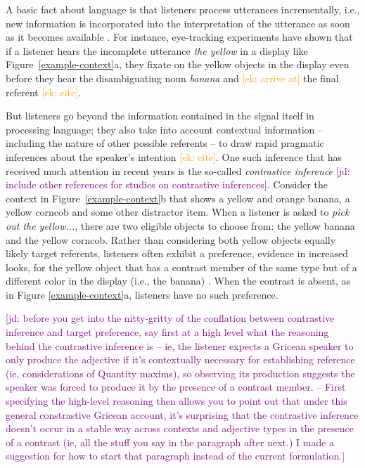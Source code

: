 \documentclass[10pt,letterpaper]{article}
\newcommand{\ek}[1]{\textcolor{Orange}{[ek: #1]}}
\newcommand{\jd}[1]{\textcolor{Purple}{[jd: #1]}}
\newcommand{\figref}[1]{Figure \ref{#1}}
\begin{document}
A basic fact about language is that listeners process utterances incrementally, i.e., new information is incorporated into the interpretation of the utterance as soon as it becomes available \cite{Eberhard:1995}. For instance, eye-tracking experiments have shown that if a listener hears the incomplete utterance \textit{the yellow} in a display like Figure~\ref{example-context}a, they fixate on the yellow objects in the display even before they hear the disambiguating noun \textit{banana} and \ek{arrive at} the final referent \ek{cite}.

But listeners go beyond the information contained in the signal itself in processing language; they also take into account contextual information -- including the nature of other possible referents  -- to draw rapid pragmatic inferences about the speaker's intention \ek{cite}. One such inference that has received much attention in recent years is the so-called \emph{contrastive inference} \cite{Sedivy:1999}\jd{include other references for studies on contrastive inferences}. Consider the context in Figure~\ref{example-context}b that shows a yellow and orange banana, a yellow corncob and some other distractor item. When a listener is asked to \textit{pick out the yellow...}, there are two eligible objects to choose from: the yellow banana and the yellow corncob. Rather than considering both yellow objects equally likely target referents, listeners often exhibit a preference, evidence in increased looks, for the yellow object that has a contrast member of the same type but of a different color in the display (i.e., the banana) \cite{Sedivy:1999, Sedivy:2003}. When the contrast is absent, as in \figref{example-context}a, listeners have no such preference. %

\jd{before you get into the nitty-gritty of the conflation between contrastive inference and target preference, say first at a high level what the reasoning behind the contrastive inference is -- ie, the listener expects a Gricean speaker to only produce the adjective if it's contextually necessary for establishing reference (ie, considerations of Quantity maxims), so observing its production suggests the speaker was forced to produce it by the presence of a contrast member. -- First specifying the high-level reasoning then allows you to point out that under this general constrastive Gricean account, it's surprising that the contrastive inference doesn't occur in a stable way across contexts and adjective types in the presence of a contrast (ie, all the stuff you say in the paragraph after next.) I made a suggestion for how to start that paragraph instead of the current formulation.}
\end{document}
